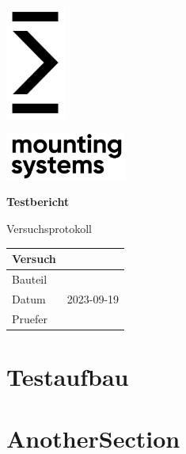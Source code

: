 \documentclass{article}%
\title{}%
\author{}%
\date{2023{-}09{-}19}%
\begin{document}
%
\normalsize%
\pagestyle{header}%

\begin{titlepage}
    \begin{minipage}[t][4cm][l]{0.4\textwidth}
        \includegraphics[width=75px]{MSG-Signet-Schwarz-CMYK-170414-02.png}
    \end{minipage}
    \hspace{2cm}
    \begin{minipage}[t][4cm][t]{0.4\textwidth}
        \includegraphics[width=150px]{MSG-Signet-Schwarz-CMYK-170414-01.png}
    \end{minipage}
    \begin{center}
    \begin{Huge}
        \textbf{Testbericht}\\
          
        
        \end{Huge}
        
    \vspace{3cm}
    \large{Versuchsprotokoll} \\
    \vspace{2cm}
    \large
    \begin{tabular}{| p{} | p{}|}
        \hline
            Versuch & \\  \hline
             Bauteil  &   \\ \hline
             Datum & 2023-09-19\\ \hline
             Pruefer & \\ \hline
             
    \end{tabular}
\end{center}
\end{titlepage}
%
\newpage%
\tableofcontents%
\newpage%
\section{Testaufbau}%
\label{sec:Testaufbau}%

%
\section{AnotherSection}%
\label{sec:AnotherSection}%

%
\end{document}
